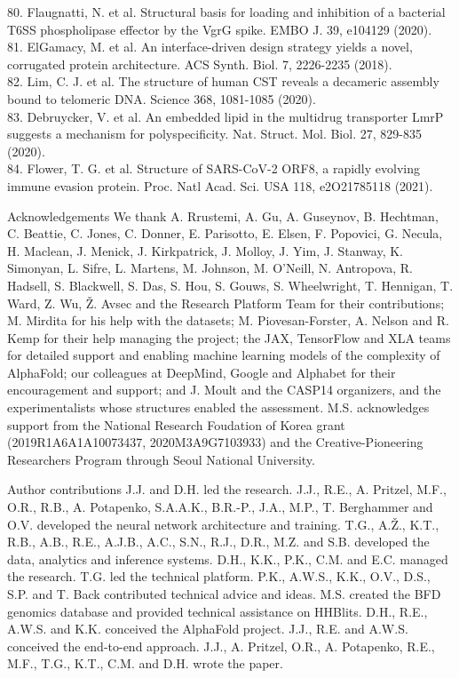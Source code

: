 \documentclass[10pt]{article}
\begin{document}
80. Flaugnatti, N. et al. Structural basis for loading and inhibition of a bacterial T6SS phospholipase effector by the VgrG spike. EMBO J. 39, e104129 (2020).\\
81. ElGamacy, M. et al. An interface-driven design strategy yields a novel, corrugated protein architecture. ACS Synth. Biol. 7, 2226-2235 (2018).\\
82. Lim, C. J. et al. The structure of human CST reveals a decameric assembly bound to telomeric DNA. Science 368, 1081-1085 (2020).\\
83. Debruycker, V. et al. An embedded lipid in the multidrug transporter LmrP suggests a mechanism for polyspecificity. Nat. Struct. Mol. Biol. 27, 829-835 (2020).\\
84. Flower, T. G. et al. Structure of SARS-CoV-2 ORF8, a rapidly evolving immune evasion protein. Proc. Natl Acad. Sci. USA 118, e2O21785118 (2021).

Acknowledgements We thank A. Rrustemi, A. Gu, A. Guseynov, B. Hechtman, C. Beattie, C. Jones, C. Donner, E. Parisotto, E. Elsen, F. Popovici, G. Necula, H. Maclean, J. Menick, J. Kirkpatrick, J. Molloy, J. Yim, J. Stanway, K. Simonyan, L. Sifre, L. Martens, M. Johnson, M. O'Neill, N. Antropova, R. Hadsell, S. Blackwell, S. Das, S. Hou, S. Gouws, S. Wheelwright, T. Hennigan, T. Ward, Z. Wu, Ž. Avsec and the Research Platform Team for their contributions; M. Mirdita for his help with the datasets; M. Piovesan-Forster, A. Nelson and R. Kemp for their help managing the project; the JAX, TensorFlow and XLA teams for detailed support and enabling machine learning models of the complexity of AlphaFold; our colleagues at DeepMind, Google and Alphabet for their encouragement and support; and J. Moult and the CASP14 organizers, and the experimentalists whose structures enabled the assessment. M.S. acknowledges support from the National Research Foudation of Korea grant (2019R1A6A1A10073437, 2020M3A9G7103933) and the Creative-Pioneering Researchers Program through Seoul National University.

Author contributions J.J. and D.H. led the research. J.J., R.E., A. Pritzel, M.F., O.R., R.B., A. Potapenko, S.A.A.K., B.R.-P., J.A., M.P., T. Berghammer and O.V. developed the neural network architecture and training. T.G., A.Ž., K.T., R.B., A.B., R.E., A.J.B., A.C., S.N., R.J., D.R., M.Z. and S.B. developed the data, analytics and inference systems. D.H., K.K., P.K., C.M. and E.C. managed the research. T.G. led the technical platform. P.K., A.W.S., K.K., O.V., D.S., S.P. and T. Back contributed technical advice and ideas. M.S. created the BFD genomics database and provided technical assistance on HHBlits. D.H., R.E., A.W.S. and K.K. conceived the AlphaFold project. J.J., R.E. and A.W.S. conceived the end-to-end approach. J.J., A. Pritzel, O.R., A. Potapenko, R.E., M.F., T.G., K.T., C.M. and D.H. wrote the paper.
\end{document}
